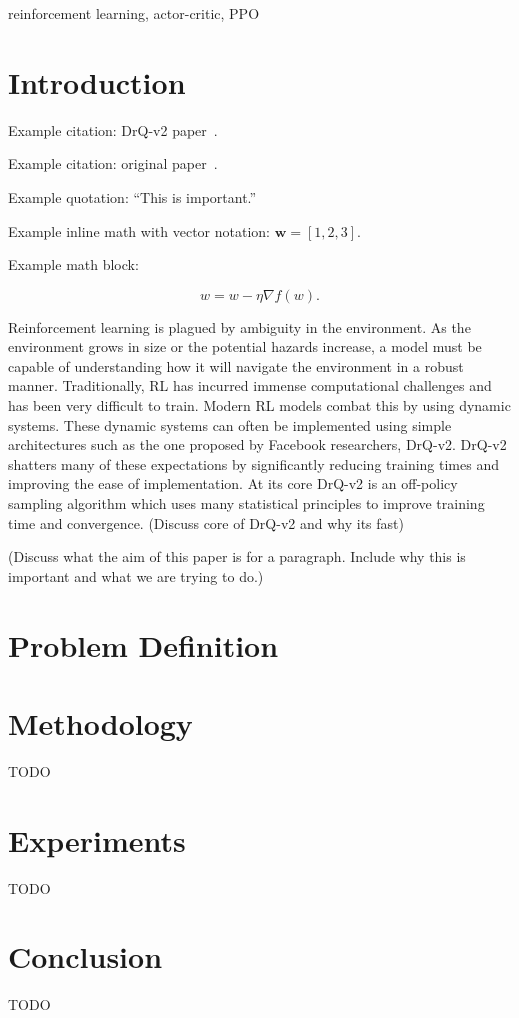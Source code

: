 \documentclass[conference]{./IEEEtran/IEEEtran} %
\begin{document}
    \begin{IEEEkeywords}
        reinforcement learning, actor-critic, PPO
    \end{IEEEkeywords}

    \section{Introduction}\label{sec:introduction}
    Example citation: DrQ-v2 paper~\cite{yarats2021drqv2}.

    Example citation: original paper~\cite{yarats2021image}.

    Example quotation: \enquote{This is important.}

    Example inline math with vector notation: \(\mathbf{w} = [1, 2, 3]\).

    Example math block:

    \[w = w - \eta \nabla f(w).\]

    Reinforcement learning is plagued by ambiguity in the environment. As the environment grows in size or the potential hazards increase, a model must be capable of understanding how it will navigate the environment in a robust manner. Traditionally, RL has incurred immense computational challenges and has been very difficult to train. Modern RL models combat this by using dynamic systems. These dynamic systems can often be implemented using simple architectures such as the one proposed by Facebook researchers, DrQ-v2. DrQ-v2 shatters many of these expectations by significantly reducing training times and improving the ease of implementation.
    At its core DrQ-v2 is an off-policy sampling algorithm which uses many statistical principles to improve training time and convergence. (Discuss core of DrQ-v2 and why its fast)

    (Discuss what the aim of this paper is for a paragraph. Include why this is important and what we are trying to do.)


    \section{Problem Definition}\label{sec:problem-definition}

    \section{Methodology}\label{sec:methodology}

    TODO

    \section{Experiments}\label{sec:experiments}

    TODO

    \section{Conclusion}\label{sec:conclusion}

    TODO

    
    
\end{document}
